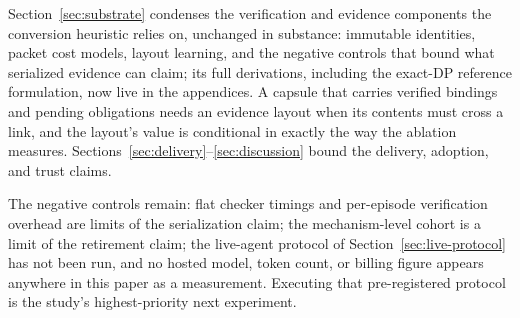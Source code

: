 Section~\ref{sec:substrate} condenses the verification and
evidence components the conversion heuristic relies on, unchanged in
substance: immutable identities, packet cost models, layout learning,
and the negative controls that bound what serialized evidence can
claim; its full derivations, including the exact-DP reference
formulation, now live in the appendices. A capsule that carries verified bindings and pending
obligations needs an evidence layout when its contents must cross a
link, and the layout's value is conditional in exactly the way the
ablation measures. Sections~\ref{sec:delivery}--\ref{sec:discussion}
bound the delivery, adoption, and trust claims.

The negative controls remain: flat checker timings and per-episode
verification overhead are limits of the serialization claim; the
mechanism-level cohort is a limit of the retirement claim; the
live-agent protocol of Section~\ref{sec:live-protocol} has not been
run, and no hosted model, token count, or billing figure appears
anywhere in this paper as a measurement. Executing that
pre-registered protocol is the study's highest-priority next
experiment.
